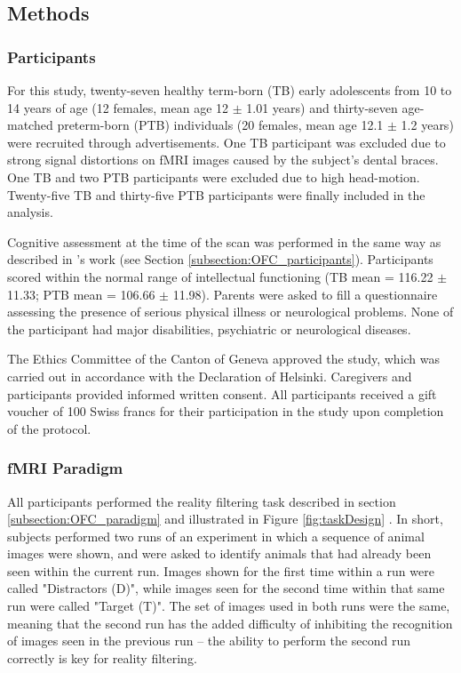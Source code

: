  
 \subsection{Methods}
 
\subsubsection{Participants} \label{subsection:PreVsCtrl_participants}
For this study, twenty-seven healthy term-born (TB) early adolescents from 10 to 14 years of age (12 females, mean age 12 $\pm$ 1.01 years) and thirty-seven age-matched preterm-born (PTB) individuals (20 females, mean age 12.1 $\pm$ 1.2 years) were recruited through advertisements. One TB participant was excluded due to strong signal distortions on fMRI images caused by the subject’s dental braces. One TB and two PTB participants were excluded due to high head-motion. Twenty-five TB and thirty-five PTB participants were finally included in the analysis.


Cognitive assessment at the time of the scan was performed in the same way as described in  \citet{Liverani2020}'s work (see Section \ref{subsection:OFC_participants}). Participants scored within the normal range of intellectual functioning (TB mean = 116.22 $\pm$ 11.33; PTB mean = 106.66 $\pm$ 11.98). Parents were asked to fill a questionnaire assessing the presence of serious physical illness or neurological problems. None of the participant had major disabilities, psychiatric or neurological diseases.

The Ethics Committee of the Canton of Geneva approved the study, which was carried out in accordance with the Declaration of Helsinki. Caregivers and participants provided informed written consent. All participants received a gift voucher of 100 Swiss francs for their participation in the study upon completion of the protocol. 


\subsubsection{fMRI Paradigm} 
All participants performed the reality filtering task described in section \ref{subsection:OFC_paradigm} and illustrated in Figure \ref{fig:taskDesign} \citep{Liverani2020}. In short, subjects performed two runs of an experiment in which a sequence of animal images were shown, and were asked to identify animals that had already been seen within the current run. Images shown for the first time within a run were called "Distractors (D)", while images seen for the second time within that same run were called "Target (T)". The set of images used in both runs were the same, meaning that the second run has the added difficulty of inhibiting the recognition of images seen in the previous run – the ability to perform the second run correctly is key for reality filtering. 

